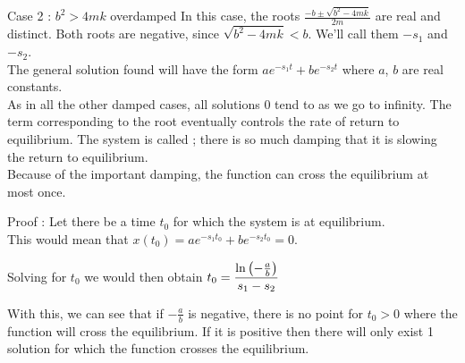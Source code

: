 \documentclass[11pt, openright]{book}
\begin{document}
\newpage

\begin{dent}{Case 2 : $b^2>4mk$ overdamped}
    In this case, the roots $\frac{-b\pm\sqrt{b^2-4mk}}{2m}$ are real and distinct. Both roots are negative, since $\sqrt{b^2-4mk}<b$. We'll call them $-s_1$ and $-s_2$.\\
    The general solution found will have the form $ae^{-s_1t}+be^{-s_2t}$ where $a$, $b$ are real constants.\\
    As in all the other damped cases, all solutions 0 tend to as we go to infinity. The term corresponding to the  root eventually controls the rate of return to equilibrium. The system is called ; there is so much damping that it is
    slowing the return to equilibrium.\\
    Because of the important damping, the function can cross the equilibrium at most once.
    \begin{dent}{Proof :} Let there be a time $t_0$ for which the system is at equilibrium.\\
        This would mean that $x(t_0)=ae^{-s_1t_0}+be^{-s_2t_0}=0$.

        Solving for $t_0$ we would then obtain $\displaystyle{t_0=\frac{\ln\left( -\frac{a}{b} \right)}{s_1-s_2}}$

        With this, we can see that if $-\frac{a}{b}$ is negative, there is no point for $t_0>0$ where the function will cross the equilibrium. If it is positive then there will only exist 1 solution for which the function crosses the equilibrium.
    \end{dent}

    \begin{figure}[ht]
        \centering
\end{figure}
\end{dent}
\end{document}
